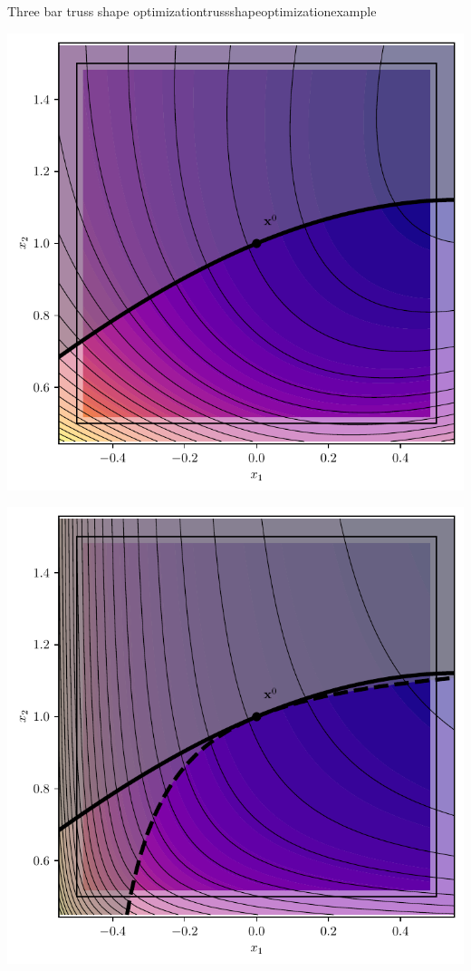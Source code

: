 \begin{example}{Three bar truss shape optimization}{trussshapeoptimizationexample}
    \begin{minipage}{.5\textwidth}
        \centering
        \includegraphics[width=0.9\linewidth]{figures/three_bar_truss_shape_original.pdf}
    \end{minipage}%
    \begin{minipage}{.5\textwidth}
        \centering
        \includegraphics[width=0.9\linewidth]{figures/three_bar_truss_shape_mma.pdf}
    \end{minipage}


\end{example}

